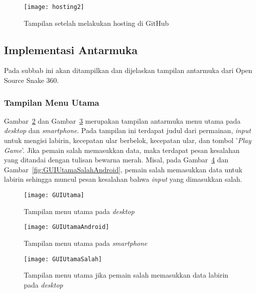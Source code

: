 \begin{figure}[H]
	\centering  
	\texttt{[image: hosting2]}  
	\caption[Tampilan setelah melakukan hosting di GitHub]{Tampilan setelah melakukan hosting di GitHub}
	\label{fig:hosting2} 
\end{figure}

\subsection{Implementasi Antarmuka}
Pada subbab ini akan ditampilkan dan dijelaskan tampilan antarmuka dari Open Source Snake 360. 

\subsubsection{Tampilan Menu Utama}
Gambar~\ref{fig:GUIUtama} dan Gambar~\ref{fig:GUIUtamaAndroid} merupakan tampilan antarmuka menu utama pada \textit{desktop} dan \textit{smartphone}. Pada tampilan ini terdapat judul dari permainan, \textit{input} untuk mengisi labirin, kecepatan ular berbelok, kecepatan ular, dan tombol '\textit{Play Game}'. Jika pemain salah memasukkan data, maka terdapat pesan kesalahan yang ditandai dengan tulisan bewarna merah. Misal, pada Gambar~\ref{fig:GUIUtamaSalah} dan Gambar~\ref{fig:GUIUtamaSalahAndroid}, pemain salah memasukkan data untuk labirin sehingga muncul pesan kesalahan bahwa \textit{input} yang dimasukkan salah.

\begin{figure}[H]
	\centering  
	\texttt{[image: GUIUtama]}  
	\caption[Tampilan menu utama pada \textit{desktop}]{Tampilan menu utama pada \textit{desktop}}
	\label{fig:GUIUtama} 
\end{figure}

\begin{figure}[H]
	\centering  
	\texttt{[image: GUIUtamaAndroid]}  
	\caption[Tampilan menu utama pada \textit{smartphone}]{Tampilan menu utama pada \textit{smartphone}}
	\label{fig:GUIUtamaAndroid} 
\end{figure}

\begin{figure}[H]
	\centering  
	\texttt{[image: GUIUtamaSalah]}  
	\caption[Tampilan menu utama jika pemain salah memasukkan data labirin pada \textit{desktop}]{Tampilan menu utama jika pemain salah memasukkan data labirin pada \textit{desktop}}
	\label{fig:GUIUtamaSalah} 
\end{figure}

